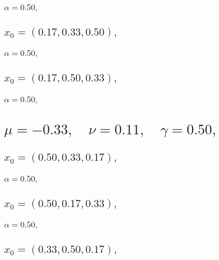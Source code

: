 \documentclass[a4paper]{article}
\begin{document}
\begin{multicols*}{2}
   \subsubsection{\(\alpha = 0.50,\quad \)}
   

   \subsection{\(x_0 = (0.17,0.33,0.50),\quad \)}
   

   \subsubsection{\(\alpha = 0.50,\quad \)}
   

   \subsection{\(x_0 = (0.17,0.50,0.33),\quad \)}
   

   \subsubsection{\(\alpha = 0.50,\quad \)}
   

   \section{\(\mu = -0.33,\quad \nu = 0.11,\quad \gamma = 0.50,\quad \)}
   

   \subsection{\(x_0 = (0.50,0.33,0.17),\quad \)}
   

   \subsubsection{\(\alpha = 0.50,\quad \)}
   

   \subsection{\(x_0 = (0.50,0.17,0.33),\quad \)}
   

   \subsubsection{\(\alpha = 0.50,\quad \)}
   

   \subsection{\(x_0 = (0.33,0.50,0.17),\quad \)}
   


\end{multicols*}
\end{document}
